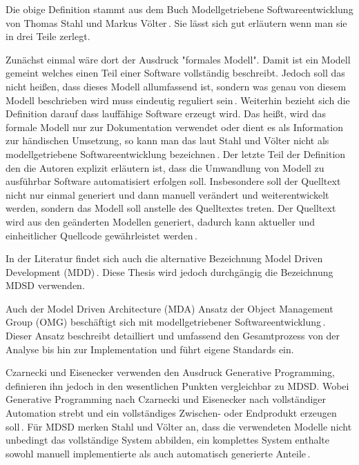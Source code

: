 \documentclass[12pt,oneside,a4paper,parskip]{scrbook}
\begin{document}
Die obige Definition stammt aus dem Buch Modellgetriebene Softwareentwicklung von Thomas Stahl und Markus Völter\,\cite[S. 11]{stahl2007}. Sie lässt sich gut erläutern wenn man sie in drei Teile zerlegt.

Zunächst einmal wäre dort der Ausdruck "formales Modell". Damit ist ein Modell gemeint welches einen Teil einer Software vollständig beschreibt. Jedoch soll das nicht heißen, dass dieses Modell allumfassend ist, sondern was genau von diesem Modell beschrieben wird muss eindeutig reguliert sein\,\cite[S. 11f.]{stahl2007}. Weiterhin bezieht sich die Definition darauf dass lauffähige Software erzeugt wird. Das heißt, wird das formale Modell nur zur Dokumentation verwendet oder dient es als Information zur händischen Umsetzung, so kann man das laut Stahl und Völter nicht als modellgetriebene Softwareentwicklung bezeichnen\,\cite[S. 12]{stahl2007}. Der letzte Teil der Definition den die Autoren explizit erläutern ist, dass die Umwandlung von Modell zu ausführbar Software automatisiert erfolgen soll. Insbesondere soll der Quelltext nicht nur einmal generiert und dann manuell verändert und weiterentwickelt werden, sondern das Modell soll anstelle des Quelltextes treten. Der Quelltext wird aus den geänderten Modellen generiert, dadurch kann aktueller und einheitlicher Quellcode gewährleistet werden\,\cite[S. 13]{stahl2007}.

In der Literatur findet sich auch die alternative Bezeichnung Model Driven Development (MDD)\,\cite{selic2003,atkinson2003}. Diese Thesis wird jedoch durchgängig die Bezeichnung MDSD verwenden.

Auch der Model Driven Architecture (MDA) Ansatz der Object Management Group (OMG) beschäftigt sich mit modellgetriebener Softwareentwicklung\,\cite{mdaguide}. Dieser Ansatz beschreibt detailliert und umfassend den Gesamtprozess von der Analyse bis hin zur Implementation und führt eigene Standards ein. 

Czarnecki und Eisenecker verwenden den Ausdruck Generative Programming, definieren ihn jedoch in den wesentlichen Punkten vergleichbar zu MDSD. Wobei Generative Programming nach Czarnecki und Eisenecker nach vollständiger Automation strebt und ein vollständiges Zwischen- oder Endprodukt erzeugen soll\,\cite[S. 5]{czaeis2000}. Für MDSD merken Stahl und Völter an, dass die verwendeten Modelle nicht unbedingt das vollständige System abbilden, ein komplettes System enthalte sowohl manuell implementierte als auch automatisch generierte Anteile\,\cite[S. 13]{stahl2007}.
\end{document}
